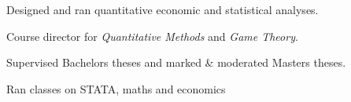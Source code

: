 \documentclass[a4paper,nomath]{deedy-resume} %
\begin{document}
\begin{minipage}[t]{0.66\textwidth}
\begin{tightitemize}
    \end{tightitemize}
    
    \sectionspace %


    \vspace{\topsep} %
    \begin{tightitemize}
    	\item Designed and ran quantitative economic and statistical analyses.
    	
    \end{tightitemize}
    
    \sectionspace %


    \vspace{\topsep} %
    \begin{tightitemize}
    	\item Course director for \textit{Quantitative Methods} and \textit{Game Theory}.
		\item Supervised Bachelors theses and marked \& moderated Masters theses.
    	
    \end{tightitemize}
    
    \sectionspace %


    
    \begin{tightitemize}
    	\item Ran classes on STATA, maths and economics
    	
    \end{tightitemize}
    
    \sectionspace %
    


\end{minipage}
\end{document}
